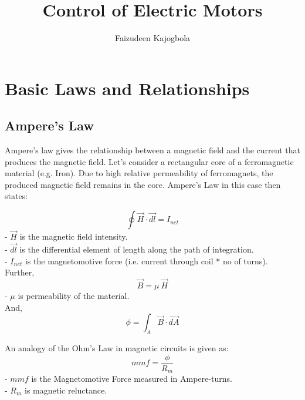 \documentclass[a4paper]{article}
\title{\Huge{Control of Electric Motors}}
\author{Faizudeen Kajogbola}
\date{} %
\begin{document}
\maketitle

\setlength{\headsep}{5pt}

\section{Basic Laws and Relationships}

\subsection{Ampere's Law}
Ampere's law gives the relationship between a magnetic field and the current that produces the magnetic field.
Let's consider a rectangular core of a ferromagnetic material (e.g. Iron). 
Due to high relative permeability of ferromagnets, the produced magnetic field remains in the core.
Ampere's Law in this case then states: 

$$\oint \vec{H} \cdot \vec{dl}= I_{net}$$
- $\vec{H}$ is the magnetic field intensity.\\
- $\vec{dl}$ is the differential element of length along the path of integration.  \\
- $I_{net}$ is the magnetomotive force (i.e. current through coil * no of turns).  \\

Further,
$$\vec{B}= \mu \  \vec{H}$$
- $\mu$ is permeability of the material.  \\

And,
$$\phi= \int_{A} \vec{B} \cdot \vec{dA}$$

An analogy of the Ohm's Law in magnetic circuits is given as:
$$mmf= \frac{\phi}{R_{m}}$$
- $mmf$ is the Magnetomotive Force measured in Ampere-turns.  \\
- $R_m$ is magnetic reluctance.  \\

\end{document}
